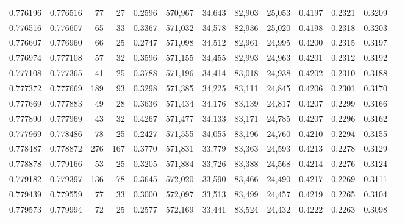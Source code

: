 \begin{tabular}{rrrrrrrrrrrrr}
0.776196 & 0.776516 &    77 &  27 &                                     0.2596 & 570,967 &  34,643 &  82,903 &  25,053 & 0.4197 & 0.2321 & 0.3209 \\
0.776516 & 0.776607 &    65 &  33 &                                     0.3367 & 571,032 &  34,578 &  82,936 &  25,020 & 0.4198 & 0.2318 & 0.3203 \\
0.776607 & 0.776960 &    66 &  25 &                                     0.2747 & 571,098 &  34,512 &  82,961 &  24,995 & 0.4200 & 0.2315 & 0.3197 \\
0.776974 & 0.777108 &    57 &  32 &                                     0.3596 & 571,155 &  34,455 &  82,993 &  24,963 & 0.4201 & 0.2312 & 0.3192 \\
0.777108 & 0.777365 &    41 &  25 &                                     0.3788 & 571,196 &  34,414 &  83,018 &  24,938 & 0.4202 & 0.2310 & 0.3188 \\
0.777372 & 0.777669 &   189 &  93 &                                     0.3298 & 571,385 &  34,225 &  83,111 &  24,845 & 0.4206 & 0.2301 & 0.3170 \\
0.777669 & 0.777883 &    49 &  28 &                                     0.3636 & 571,434 &  34,176 &  83,139 &  24,817 & 0.4207 & 0.2299 & 0.3166 \\
0.777890 & 0.777969 &    43 &  32 &                                     0.4267 & 571,477 &  34,133 &  83,171 &  24,785 & 0.4207 & 0.2296 & 0.3162 \\
0.777969 & 0.778486 &    78 &  25 &                                     0.2427 & 571,555 &  34,055 &  83,196 &  24,760 & 0.4210 & 0.2294 & 0.3155 \\
0.778487 & 0.778872 &   276 & 167 &                                     0.3770 & 571,831 &  33,779 &  83,363 &  24,593 & 0.4213 & 0.2278 & 0.3129 \\
0.778878 & 0.779166 &    53 &  25 &                                     0.3205 & 571,884 &  33,726 &  83,388 &  24,568 & 0.4214 & 0.2276 & 0.3124 \\
0.779182 & 0.779397 &   136 &  78 &                                     0.3645 & 572,020 &  33,590 &  83,466 &  24,490 & 0.4217 & 0.2269 & 0.3111 \\
0.779439 & 0.779559 &    77 &  33 &                                     0.3000 & 572,097 &  33,513 &  83,499 &  24,457 & 0.4219 & 0.2265 & 0.3104 \\
0.779573 & 0.779994 &    72 &  25 &                                     0.2577 & 572,169 &  33,441 &  83,524 &  24,432 & 0.4222 & 0.2263 & 0.3098 \\

\end{tabular}
